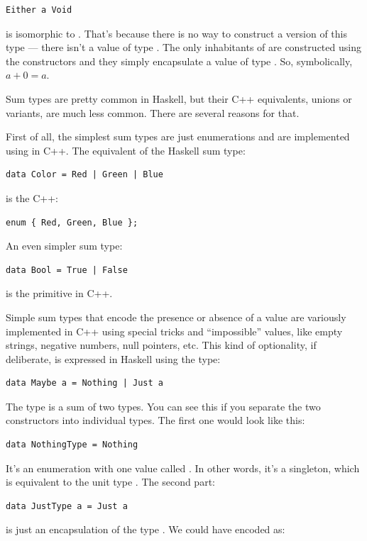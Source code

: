 \begin{Verbatim}
Either a Void
\end{Verbatim}
is isomorphic to . That's because there is no way to construct
a  version of this type --- there isn't a value of type
. The only inhabitants of  are
constructed using the  constructors and they simply
encapsulate a value of type . So, symbolically, $a + 0 = a$.

Sum types are pretty common in Haskell, but their C++ equivalents,
unions or variants, are much less common. There are several reasons for
that.

First of all, the simplest sum types are just enumerations and are
implemented using  in C++. The equivalent of the Haskell
sum type:

\begin{Verbatim}
data Color = Red | Green | Blue
\end{Verbatim}
is the C++:

\begin{Verbatim}
enum { Red, Green, Blue };
\end{Verbatim}
An even simpler sum type:

\begin{Verbatim}
data Bool = True | False
\end{Verbatim}
is the primitive  in C++.

Simple sum types that encode the presence or absence of a value are
variously implemented in C++ using special tricks and ``impossible''
values, like empty strings, negative numbers, null pointers, etc. This
kind of optionality, if deliberate, is expressed in Haskell using the
 type:

\begin{Verbatim}
data Maybe a = Nothing | Just a
\end{Verbatim}
The  type is a sum of two types. You can see this if you
separate the two constructors into individual types. The first one would
look like this:

\begin{Verbatim}
data NothingType = Nothing
\end{Verbatim}
It's an enumeration with one value called . In other
words, it's a singleton, which is equivalent to the unit type
\code{()}. The second part:

\begin{Verbatim}
data JustType a = Just a
\end{Verbatim}
is just an encapsulation of the type . We could have encoded
 as:

